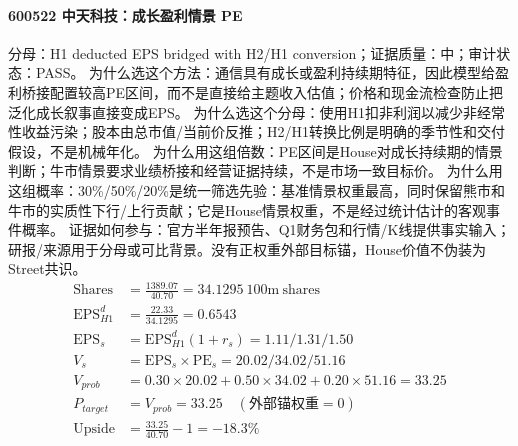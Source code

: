 \paragraph{600522 中天科技：成长盈利情景 PE}
分母：H1 deducted EPS bridged with H2/H1 conversion；证据质量：中；审计状态：PASS。
为什么选这个方法：通信具有成长或盈利持续期特征，因此模型给盈利桥接配置较高PE区间，而不是直接给主题收入估值；价格和现金流检查防止把泛化成长叙事直接变成EPS。
为什么选这个分母：使用H1扣非利润以减少非经常性收益污染；股本由总市值/当前价反推；H2/H1转换比例是明确的季节性和交付假设，不是机械年化。
为什么用这组倍数：PE区间是House对成长持续期的情景判断；牛市情景要求业绩桥接和经营证据持续，不是市场一致目标价。
为什么用这组概率：30\%/50\%/20\%是统一筛选先验：基准情景权重最高，同时保留熊市和牛市的实质性下行/上行贡献；它是House情景权重，不是经过统计估计的客观事件概率。
证据如何参与：官方半年报预告、Q1财务包和行情/K线提供事实输入；研报/来源用于分母或可比背景。没有正权重外部目标锚，House价值不伪装为Street共识。
\begin{align*}
\mathrm{Shares} &= \frac{1389.07}{40.70}=34.1295\ \mathrm{100m\ shares}\\
\mathrm{EPS}_{H1}^d &= \frac{22.33}{34.1295}=0.6543\\
\mathrm{EPS}_s &= \mathrm{EPS}_{H1}^d(1+r_s)=1.11/1.31/1.50\\
V_s &= \mathrm{EPS}_s\times \mathrm{PE}_s=20.02/34.02/51.16\\
V_{prob} &= 0.30\times 20.02+0.50\times 34.02+0.20\times 51.16=33.25\\
P_{target} &= V_{prob}=33.25\quad(\text{外部锚权重}=0)\\
\mathrm{Upside} &= \frac{33.25}{40.70}-1=-18.3\%\\
\end{align*}

